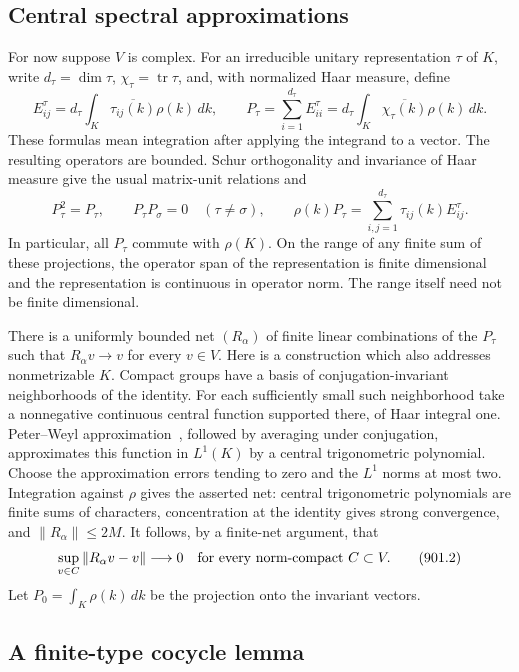 \documentclass[11pt,a4paper]{article}
\theoremstyle{remark}
\begin{document}
\subsection{Central spectral approximations}

For now suppose $V$ is complex. For an irreducible unitary representation
$\tau$ of $K$, write $d_\tau=\dim\tau$, $\chi_\tau=\operatorname{tr}\tau$,
and, with normalized Haar measure, define
\[
 E^{\tau}_{ij}=d_\tau\int_K\overline{\tau_{ij}(k)}\rho(k)\,dk,
 \qquad
 P_\tau=\sum_{i=1}^{d_\tau}E^{\tau}_{ii}
       =d_\tau\int_K\overline{\chi_\tau(k)}\rho(k)\,dk .
\]
These formulas mean integration after applying the integrand to a vector.
The resulting operators are bounded. Schur orthogonality and invariance of
Haar measure give the usual matrix-unit relations and
\[
 P_\tau^2=P_\tau,\qquad P_\tau P_\sigma=0\quad(\tau\ne\sigma),
 \qquad
 \rho(k)P_\tau=\sum_{i,j=1}^{d_\tau}\tau_{ij}(k)E^{\tau}_{ij}.
 \tag{901.1}\label{eq:901-matrix}
\]
In particular, all $P_\tau$ commute with $\rho(K)$. On the range of any
finite sum of these projections, the operator span of the representation is
finite dimensional and the representation is continuous in operator norm.
The range itself need not be finite dimensional.

There is a uniformly bounded net $(R_\alpha)$ of finite linear combinations
of the $P_\tau$ such that $R_\alpha v\to v$ for every $v\in V$.
Here is a construction which also addresses nonmetrizable $K$. Compact groups
have a basis of conjugation-invariant neighborhoods of the identity. For
each sufficiently small such neighborhood take a nonnegative continuous
central function supported there, of Haar integral one. Peter--Weyl approximation~\cite[Theorem 1 and Proposition 6]{Tao2011}, followed by averaging under conjugation, approximates this
function in $L^1(K)$ by a central trigonometric polynomial. Choose the
approximation errors tending to zero and the $L^1$ norms at most two.
Integration against $\rho$ gives the asserted net: central trigonometric
polynomials are finite sums of characters, concentration at the identity
gives strong convergence, and $\|R_\alpha\|\le2M$.
It follows, by a finite-net argument, that
\[
 \sup_{v\in C}\|R_\alpha v-v\|\longrightarrow0
 \quad\hbox{for every norm-compact }C\subset V.
 \tag{901.2}\label{eq:901-compact}
\]
Let $P_0=\int_K\rho(k)\,dk$ be the projection onto the invariant vectors.

\subsection{A finite-type cocycle lemma}
\end{document}
